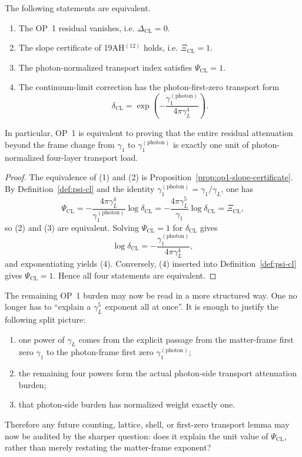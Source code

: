 \begin{proposition}
\label{prop:op1-frame-transport-split}
The following statements are equivalent.
\begin{enumerate}[leftmargin=2em]
 \item The OP~1 residual vanishes, i.e. \(\Delta_{\mathrm{CL}}=0\).
 \item The slope certificate of 19AH$^{(12)}$ holds, i.e. \(\Xi_{\mathrm{CL}}=1\).
 \item The photon-normalized transport index satisfies \(\Psi_{\mathrm{CL}}=1\).
 \item The continuum-limit correction has the photon-first-zero transport form
 \[
 \delta_{\mathrm{CL}}
 = \exp\!\left(-\frac{\gamma_1^{(\mathrm{photon})}}{4\pi\gamma_L^4}\right).
 \]
\end{enumerate}
In particular, OP~1 is equivalent to proving that the entire residual attenuation beyond the frame change from \(\gamma_1\) to \(\gamma_1^{(\mathrm{photon})}\) is exactly one unit of photon-normalized four-layer transport load.
\end{proposition}

\begin{proof}
The equivalence of (1) and (2) is Proposition~\ref{prop:op1-slope-certificate}. By Definition~\ref{def:psi-cl} and the identity \(\gamma_1^{(\mathrm{photon})}=\gamma_1/\gamma_L\), one has
\[
 \Psi_{\mathrm{CL}}
 =
 -\frac{4\pi\gamma_L^4}{\gamma_1^{(\mathrm{photon})}}\log \delta_{\mathrm{CL}}
 =
 -\frac{4\pi\gamma_L^5}{\gamma_1}\log \delta_{\mathrm{CL}}
 = \Xi_{\mathrm{CL}},
\]
so (2) and (3) are equivalent. Solving \(\Psi_{\mathrm{CL}}=1\) for \(\delta_{\mathrm{CL}}\) gives
\[
 \log \delta_{\mathrm{CL}} = -\frac{\gamma_1^{(\mathrm{photon})}}{4\pi\gamma_L^4},
\]
and exponentiating yields (4). Conversely, (4) inserted into Definition~\ref{def:psi-cl} gives \(\Psi_{\mathrm{CL}}=1\). Hence all four statements are equivalent.
\end{proof}

\begin{corollary}
\label{cor:op1-r03-target}
The remaining OP~1 burden may now be read in a more structured way. One no longer has to ``explain a \(\gamma_L^5\) exponent all at once''. It is enough to justify the following split picture:
\begin{enumerate}[leftmargin=2em]
 \item one power of \(\gamma_L\) comes from the explicit passage from the matter-frame first zero \(\gamma_1\) to the photon-frame first zero \(\gamma_1^{(\mathrm{photon})}\);
 \item the remaining four powers form the actual photon-side transport attenuation burden;
 \item that photon-side burden has normalized weight exactly one.
\end{enumerate}
Therefore any future counting, lattice, shell, or first-zero transport lemma may now be audited by the sharper question: does it explain the unit value of \(\Psi_{\mathrm{CL}}\), rather than merely restating the matter-frame exponent?
\end{corollary}

